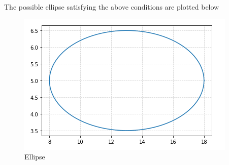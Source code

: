 \documentclass[journal,12pt,twocolumn]{IEEEtran}
\begin{document}
The possible ellipse satisfying the above
conditions are plotted below 

\begin{figure}[ht]
    \centering
    \includegraphics[width=\columnwidth]{ellipse.png}
    \caption{Ellipse}
    \label{Ellipse along given axis}
\end{figure}
\end{document}
